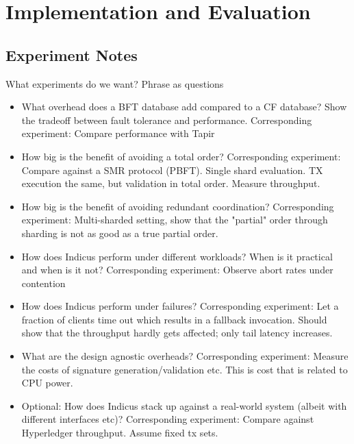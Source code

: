 \section{Implementation and Evaluation}



\subsection{Experiment Notes}
What experiments do we want? Phrase as questions

\begin{itemize}
\item What overhead does a BFT database add compared to a CF database? Show the tradeoff between fault tolerance and performance.
Corresponding experiment: Compare performance with Tapir
\item How big is the benefit of avoiding a total order?
Corresponding experiment: Compare against a SMR protocol (PBFT). Single shard evaluation. TX execution the same, but validation in total order. Measure throughput.
\item How big is the benefit of avoiding redundant coordination?
Corresponding experiment: Multi-sharded setting, show that the "partial" order through sharding is not as good as a true partial order.
\item How does Indicus perform under different workloads? When is it practical and when is it not?
Corresponding experiment: Observe abort rates under contention
\item How does Indicus perform under failures?
Corresponding experiment: Let a fraction of clients time out which results in a fallback invocation. Should show that the throughput hardly gets affected; only tail latency increases.
\item What are the design agnostic overheads?
Corresponding experiment: Measure the costs of signature generation/validation etc. This is cost that is related to CPU power.
\item Optional: How does Indicus stack up against a real-world system (albeit with different interfaces etc)?
Corresponding experiment: Compare against Hyperledger throughput. Assume fixed tx sets.
\end{itemize}




